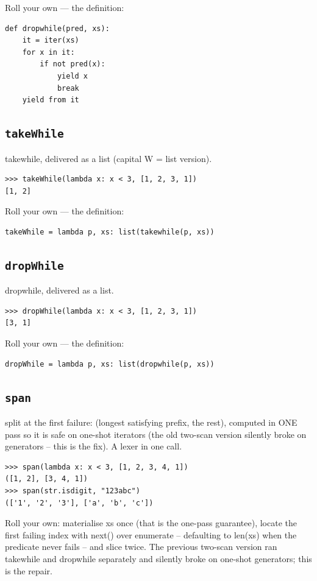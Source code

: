 \documentclass[10pt,letterpaper]{book}
\begin{document}
Roll your own --- the definition:

\begin{lstlisting}[style=ex]
def dropwhile(pred, xs):
    it = iter(xs)
    for x in it:
        if not pred(x):
            yield x
            break
    yield from it
\end{lstlisting}
\subsection{\texttt{takeWhile}}\label{def:takeWhile}
takewhile, delivered as a list (capital W = list version).
\begin{lstlisting}[style=ex]
>>> takeWhile(lambda x: x < 3, [1, 2, 3, 1])
[1, 2]
\end{lstlisting}

Roll your own --- the definition:

\begin{lstlisting}[style=ex]
takeWhile = lambda p, xs: list(takewhile(p, xs))
\end{lstlisting}
\subsection{\texttt{dropWhile}}\label{def:dropWhile}
dropwhile, delivered as a list.
\begin{lstlisting}[style=ex]
>>> dropWhile(lambda x: x < 3, [1, 2, 3, 1])
[3, 1]
\end{lstlisting}

Roll your own --- the definition:

\begin{lstlisting}[style=ex]
dropWhile = lambda p, xs: list(dropwhile(p, xs))
\end{lstlisting}
\subsection{\texttt{span}}\label{def:span}
split at the first failure: (longest satisfying prefix, the rest), computed in ONE pass so it is safe on one-shot iterators (the old two-scan version silently broke on generators -- this is the fix). A lexer in one call.
\begin{lstlisting}[style=ex]
>>> span(lambda x: x < 3, [1, 2, 3, 4, 1])
([1, 2], [3, 4, 1])
>>> span(str.isdigit, "123abc")
(['1', '2', '3'], ['a', 'b', 'c'])
\end{lstlisting}

Roll your own: materialise xs once (that is the one-pass guarantee), locate the first failing index with next() over enumerate -- defaulting to len(xs) when the predicate never fails -- and slice twice. The previous two-scan version ran takewhile and dropwhile separately and silently broke on one-shot generators; this is the repair.
\end{document}

